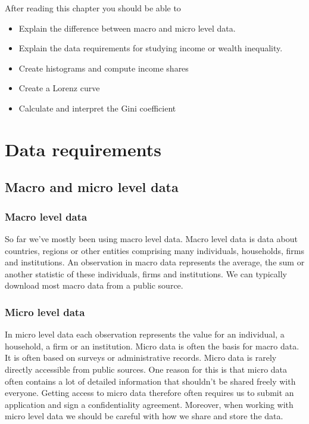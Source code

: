 \documentclass[]{book}
\providecommand{\tightlist}{%
  \setlength{\itemsep}{0pt}\setlength{\parskip}{0pt}}
\begin{document}
After reading this chapter you should be able to

\begin{itemize}
\tightlist
\item
  Explain the difference between macro and micro level data.
\item
  Explain the data requirements for studying income or wealth inequality.
\item
  Create histograms and compute income shares
\item
  Create a Lorenz curve
\item
  Calculate and interpret the Gini coefficient
\end{itemize}

\hypertarget{data-requirements-1}{%
\section{Data requirements}\label{data-requirements-1}}

\hypertarget{macro-and-micro-level-data}{%
\subsection{Macro and micro level data}\label{macro-and-micro-level-data}}

\hypertarget{macro-level-data}{%
\subsubsection*{Macro level data}\label{macro-level-data}}

So far we've mostly been using macro level data. Macro level data is data about countries, regions or other entities comprising many individuals, households, firms and institutions. An observation in macro data represents the average, the sum or another statistic of these individuals, firms and institutions. We can typically download most macro data from a public source.

\hypertarget{micro-level-data}{%
\subsubsection*{Micro level data}\label{micro-level-data}}

In micro level data each observation represents the value for an individual, a household, a firm or an institution. Micro data is often the basis for macro data. It is often based on surveys or administrative records. Micro data is rarely directly accessible from public sources. One reason for this is that micro data often contains a lot of detailed information that shouldn't be shared freely with everyone. Getting access to micro data therefore often requires us to submit an application and sign a confidentiality agreement. Moreover, when working with micro level data we should be careful with how we share and store the data.
\end{document}
